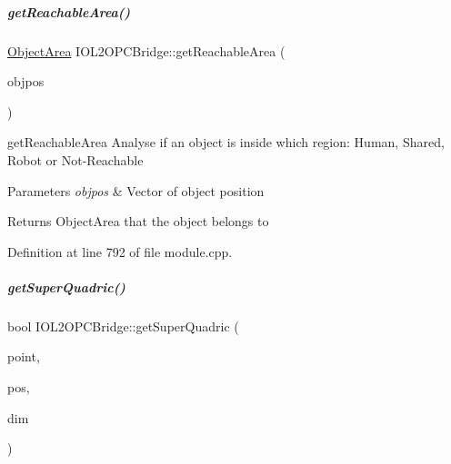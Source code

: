 \mbox{\label{group__iol2opc_a4cecacb6f48875b87a6e9351d9d46a5d}} 
\subparagraph{\texorpdfstring{get\+Reachable\+Area()}{getReachableArea()}}
{\footnotesize\ttfamily \hyperlink{namespaceicubclient_a582031d3e105cc59d614d15d30d22e65}{Object\+Area} I\+O\+L2\+O\+P\+C\+Bridge\+::get\+Reachable\+Area (\begin{DoxyParamCaption}\item[{const yarp\+::sig\+::\+Vector\+Of$<$ double $>$ \&}]{objpos }\end{DoxyParamCaption})\hspace{0.3cm}{\ttfamily [protected]}}



get\+Reachable\+Area Analyse if an object is inside which region\+: Human, Shared, Robot or Not-\/\+Reachable 


\begin{DoxyParams}{Parameters}
{\em objpos} & Vector of object position \\
\hline
\end{DoxyParams}
\begin{DoxyReturn}{Returns}
Object\+Area that the object belongs to 
\end{DoxyReturn}


Definition at line 792 of file module.\+cpp.

\mbox{\label{group__iol2opc_a6226f7de8cac860645608e45759f8d9a}} 
\subparagraph{\texorpdfstring{get\+Super\+Quadric()}{getSuperQuadric()}}
{\footnotesize\ttfamily bool I\+O\+L2\+O\+P\+C\+Bridge\+::get\+Super\+Quadric (\begin{DoxyParamCaption}\item[{const Cv\+Point \&}]{point,  }\item[{Vector \&}]{pos,  }\item[{Vector \&}]{dim }\end{DoxyParamCaption})\hspace{0.3cm}{\ttfamily [protected]}}



